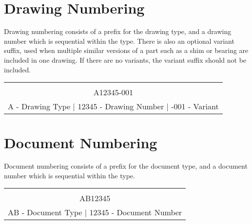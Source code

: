 \documentclass[12pt,article]{memoir}
\begin{document}
\section{Drawing Numbering}
Drawing numbering consists of a prefix for the drawing type, and a drawing number which is sequential within the type. There is also an optional variant suffix, used when multiple similar versions of a part such as a shim or bearing are included in one drawing. If there are no variants, the variant suffix should not be included.
\begin{table}[h]
	\centering
	\begin{tabu}{|c|}
		\hline\\
		\huge \colorbox{shadecolor1}{A}\colorbox{shadecolor2}{12345}\colorbox{shadecolor3}{-001}\\
		\colorbox{shadecolor1}{A} - Drawing Type | \colorbox{shadecolor2}{12345} - Drawing Number | \colorbox{shadecolor3}{-001} - Variant\\ \hline
	\end{tabu}
\end{table}\par

\section{Document Numbering}
Document numbering consists of a prefix for the document type, and a document number which is sequential within the type.
\begin{table}[h]
	\centering
	\begin{tabu}{|c|}
		\hline\\
		\huge \colorbox{shadecolor1}{AB}\colorbox{shadecolor2}{12345}\\
		\colorbox{shadecolor1}{AB} - Document Type | \colorbox{shadecolor2}{12345} - Document Number\\ \hline
	\end{tabu}
\end{table}\par
\end{document}
